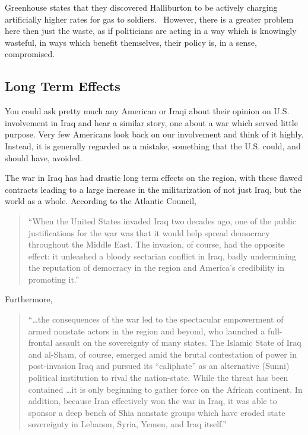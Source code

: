 \documentclass[12pt]{article}
\begin{document}
        Greenhouse states that they discovered Halliburton to be actively charging artificially higher rates for gas to soldiers.~\parencite{nytimes2005halliburtoncontract} However, there is a greater problem here then just the waste, as if politicians are acting in a way which is knowingly wasteful, in ways which benefit themselves, their policy is, in a sense, compromised. 

        
     \subsection{Long Term Effects}   
        You could ask pretty much any American or Iraqi about their opinion on U.S. involvement in Iraq and hear a similar story, one about a war which served little purpose. Very few Americans look back on our involvement and think of it highly. Instead, it is generally regarded as a mistake, something that the U.S. could, and should have, avoided. \parencite{igielnik2019wars}

        The war in Iraq has had drastic long term effects on the region, with these flawed contracts leading to a large increase in the militarization of not just Iraq, but the world as a whole. According to the Atlantic Council,

        \begin{quotation}
            ``When the United States invaded Iraq two decades ago, one of the public justifications for the war was that it would help spread democracy throughout the Middle East. The invasion, of course, had the opposite effect: it unleashed a bloody sectarian conflict in Iraq, badly undermining the reputation of democracy in the region and America's credibility in promoting it.'' \parencite{atlanticcouncil_iraqwar2023}
        \end{quotation}

        Furthermore, 

        \begin{quotation}
            ``\ldots the consequences of the war led to the spectacular empowerment of armed nonstate actors in the region and beyond, who launched a full-frontal assault on the sovereignty of many states. The Islamic State of Iraq and al-Sham, of course, emerged amid the brutal contestation of power in post-invasion Iraq and pursued its “caliphate” as an alternative (Sunni) political institution to rival the nation-state. While the threat has been contained \ldots it is only beginning to gather force on the African continent. In addition, because Iran effectively won the war in Iraq, it was able to sponsor a deep bench of Shia nonstate groups which have eroded state sovereignty in Lebanon, Syria, Yemen, and Iraq itself.'' \parencite{atlanticcouncil_iraqwar2023}
        \end{quotation}
\end{document}
